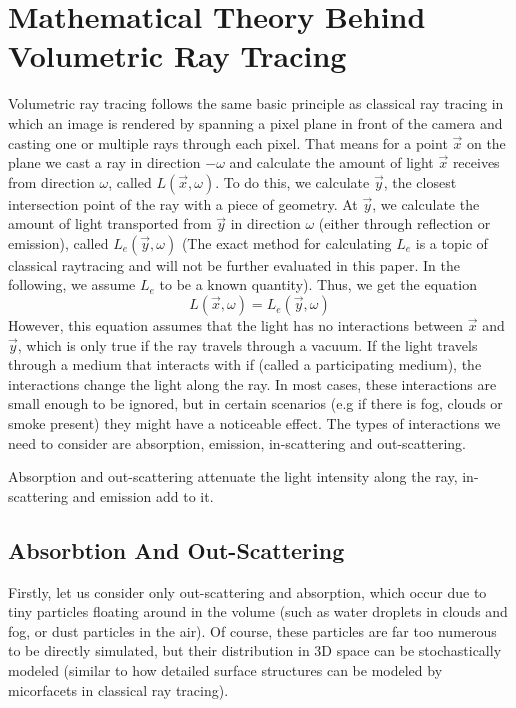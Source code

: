 \section{Mathematical Theory Behind Volumetric Ray Tracing}
Volumetric ray tracing follows the same basic principle as classical ray tracing in which an image is rendered by spanning a pixel plane in front of the camera and casting one or multiple rays through each pixel.
That means for a point $\vec{x}$ on the plane we cast a ray in direction $-\omega$ and calculate the amount of light $\vec{x}$ receives from direction $\omega$, called $L(\vec{x},\omega )$.
To do this, we calculate $\vec{y}$, the closest intersection point of the ray with a piece of geometry. At $\vec{y}$, we calculate the amount of light transported from $\vec{y}$ in direction $\omega$ (either through reflection or emission), called $L_e(\vec{y},\omega )$ (The exact method for calculating $L_e$ is a topic of classical raytracing and will not be further evaluated in this paper. In the following, we assume $L_e$ to be a known quantity).
Thus, we get the equation 
\begin{equation}
L(\vec{x},\omega ) = L_e(\vec{y}, \omega )
\end{equation}
However, this equation assumes that the light has no interactions between $\vec{x}$ and $\vec{y}$, which is only true if the ray travels through a vacuum. If the light travels through a medium that interacts with if (called a participating medium), the interactions change the light along the ray. In most cases, these interactions are small enough to be ignored, but in certain scenarios (e.g if there is fog, clouds or smoke present) they might have a noticeable effect. The types of interactions we need to consider are absorption, emission, in-scattering and out-scattering.

Absorption and out-scattering attenuate the light intensity along the ray, in-scattering and emission add to it.
\subsection{Absorbtion And Out-Scattering}
Firstly, let us consider only out-scattering and absorption, which occur due to tiny particles floating around in the volume (such as water droplets in clouds and fog, or dust particles in the air).
Of course, these particles are far too numerous to be directly simulated, but their distribution in 3D space can be stochastically modeled (similar to how detailed surface structures can be modeled by micorfacets in classical ray tracing).

